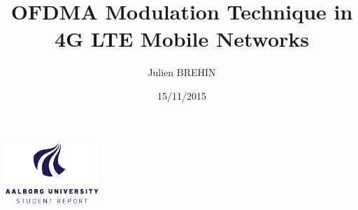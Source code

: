 




\title{OFDMA Modulation Technique in 4G LTE Mobile Networks}
\author{Julien BREHIN}
\date{15/11/2015}

\begin{titlepage}
\maketitle
\includegraphics[width=100pt]{aau_logo_en.pdf}
\end{titlepage}

\tableofcontents









\printbibliography

